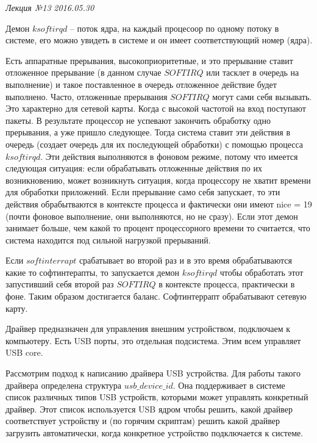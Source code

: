 \clearpage
\begin{flushright}
	\textit{Лекция №13}
	\textit{2016.05.30}
\end{flushright}

Демон $ksoftirqd$ – поток ядра, на каждый процесоор по одному потоку в системе, его можно увидеть в системе и он имеет соответствующий номер (ядра).

Есть аппаратные прерывания, высокоприоритетные, и это прерывание ставит отложенное прерывание (в данном случае $SOFTIRQ$ или $тасклет$ в очередь на выполнение) и такое поставленное в очередь отложенное действие будет выполнено. Часто, отложенные прерывания $SOFTIRQ$ могут сами себя вызывать. Это характерно для сетевой карты. Когда с высокой частотой на вход поступают пакеты. В результате процессор не успевают закончить обработку одно прерывания, а уже пришло следующее. Тогда система ставит эти действия в очередь (создает очередь для их последующей обработки) с помощью процесса $ksoftirqd$. Эти действия выполняются в фоновом режиме, потому что имеется следующая ситуация: если обрабатывать отложенные действия по их возникновению, может возникнуть ситуация, когда процессору не хватит времени для обработки приложений. Если прерывание само себя запускает, то эти действия обрабытваются в контексте процесса и фактически они имеют nice = 19 (почти фоновое выполнение, они выполняются, но не сразу). Если этот демон занимает больше, чем какой то процент процессорного времени то считается, что система находится под сильной нагрузкой прерываний.

Если $softinterrapt$   срабатывает во второй раз и в это время обрабатываются какие то софтинтерапты, то запускается демон $ksoftirqd$  чтобы обработать этот запустивший себя второй раз $SOFTIRQ$ в контексте процесса, практически в фоне. Таким образом достигается баланс. Софтинтеррапт обрабатывают сетевую карту. 

Драйвер предназначен для управления внешним устройством, подключаем к компьютеру. Есть USB порты, это отдельная подсистема. Этим всем управляет USB core.  

Рассмотрим подход к написанию драйвера USB устройства. Для работы такого драйвера определена структура $usb\_device\_id$. Она поддерживает в системе список различных типов USB устройств, которыми может управлять конкретный драйвер.  Этот список используется USB ядром чтобы решить, какой драйвер соответствует устройству и (по горячим скриптам) решить какой драйвер загрузить автоматически, когда конкретное устройство подключается к системе. 

